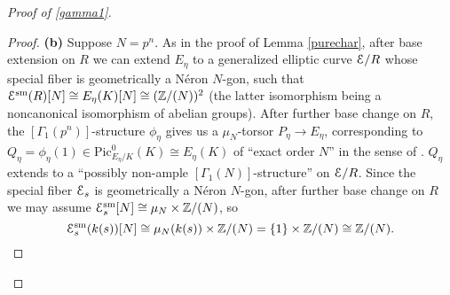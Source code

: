 \documentclass[11pt]{amsart}
\theoremstyle{definition}
\begin{document}
\begin{proof}[Proof of \ref{gamma1}]
\begin{proof}
\textbf{(b)} Suppose $N = p^n$. As in the proof of Lemma \ref{purechar}, after base extension on $R$ we can extend $E_\eta$ to a generalized elliptic curve ${\mathbf{\EuScript{E}}}/R$ whose special fiber is geometrically a N\'eron $N$-gon, such that ${\mathbf{\EuScript{E}}}^{\mathrm{sm}}(R)[N] \cong E_\eta(K)[N] \cong (\mathbb{Z}/(N))^2$ (the latter isomorphism being a noncanonical isomorphism of abelian groups). After further base change on $R$, the $[\Gamma_1(p^n)]$-structure $\phi_\eta$ gives us a $\mu_N$-torsor $P_\eta \rightarrow E_\eta$, corresponding to $Q_\eta = \phi_\eta(1) \in \mathrm{Pic}^0_{E_\eta/K}(K) \cong E_\eta(K)$ of ``exact order $N$'' in the sense of \cite[\S1.4]{KM1}. $Q_\eta$ extends to a ``possibly non-ample $[\Gamma_1(N)]$-structure'' on ${\mathbf{\EuScript{E}}}/R$. Since the special fiber ${\mathbf{\EuScript{E}}}_s$ is geometrically a N\'eron $N$-gon, after further base change on $R$ we may assume ${\mathbf{\EuScript{E}}}^{\mathrm{sm}}_s[N] \cong \mu_N \times \mathbb{Z}/(N)$, so 
\begin{displaymath}
{\mathbf{\EuScript{E}}}^{\mathrm{sm}}_s(k(s))[N] \cong \mu_N(k(s)) \times \mathbb{Z}/(N) = \{1\} \times \mathbb{Z}/(N) \cong \mathbb{Z}/(N).
\end{displaymath}


\end{proof}
\end{proof}
\end{document}
